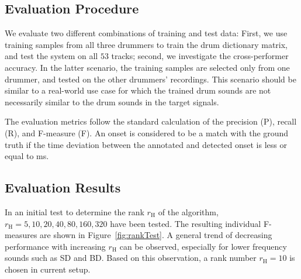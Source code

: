 \documentclass{article}
\newcommand{\figref}[1]{\mbox{Figure~\ref{#1}}}
\begin{document}
\subsection{Evaluation Procedure}\label{subsec:evaluation procedure}
We evaluate two different combinations of training and test data: First, we use training samples from all three drummers to train the drum dictionary matrix, and test the system on all $53$ tracks; second, we investigate the cross-performer accuracy. %
In the latter scenario, the training samples are selected only from one drummer, and tested on the other drummers' recordings. This scenario should be similar to a real-world use case for which the trained drum sounds are not necessarily similar to the drum sounds in the target signals.


The evaluation metrics follow the standard calculation of the precision (P), recall (R), and F-measure (F).  %
An onset is considered to be a match with the ground truth if the time deviation between the annotated and detected onset is less or equal to \unit[50]{ms}.  

\subsection{Evaluation Results}\label{subsec:evaluation results}
In an initial test to determine the rank $r_\mathrm{H}$ of the algorithm, $r_\mathrm{H} = {5, 10, 20, 40, 80, 160, 320}$ have been tested. The resulting individual F-measures are shown in \figref{fig:rankTest}. A general trend of decreasing performance with increasing $r_\mathrm{H}$ can be observed, especially for lower frequency sounds such as SD and BD. Based on this observation, a rank number $r_\mathrm{H} = 10$ is chosen in current setup.

\end{document}
